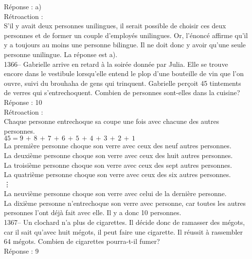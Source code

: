 ﻿\documentclass[letterpaper, 12pt]{article}
\begin{document}
R\'eponse : a)\\

R\'etroaction : \\
S'il y avait deux personnes unilingues, il serait possible de choisir ces
deux personnes et de former un couple d'employ\'es unilingues.  Or,
l'\'enonc\'e affirme qu'il y a toujours au moins une personne bilingue.  Il
ne doit donc y avoir qu'une seule personne unilingue.  La r\'eponse est
a).\\

1366-- Gabrielle arrive en retard \`a la soir\'ee donn\'ee par Julia.  Elle
se trouve encore dans le vestibule lorsqu'elle entend le plop d'une
bouteille de vin que l'on ouvre, suivi du brouhaha de gens qui trinquent.
Gabrielle per\c coit 45 tintements de verres qui s'entrechoquent.  Combien
de personnes sont-elles dans la cuisine?\\

R\'eponse : 10\\

R\'etroaction :\\
Chaque personne entrechoque sa coupe une fois avec chacune des autres
personnes.  \\
$45=9\,+\,8\,+\,7\,+\,6\,+\,5\,+\,4\,+\,3\,+\,2\,+\,1$\\
La premi\`ere personne choque son verre avec ceux des neuf autres
personnes.\\
La deuxi\`eme personne choque son verre avec ceux des huit autres
personnes.\\
La troisi\`eme personne choque son verre avec ceux des sept autres
personnes.\\
La quatri\`eme personne choque son verre avec ceux des six autres
personnes.\\
\vdots\\
La neuvi\`eme personne choque son verre avec celui de la derni\`ere
personne.\\
La dixi\`eme personne n'entrechoque son verre avec personne, car toutes les
autres personnes l'ont d\'ej\`a fait avec elle.  Il y a donc 10 personnes.\\

1367-- Un clochard n'a plus de cigarettes.  Il d\'ecide donc de ramasser des
m\'egots, car il sait qu'avec huit m\'egots, il peut faire une cigarette.
Il r\'eussit \`a rassembler 64 m\'egots.  Combien de cigarettes pourra-t-il
fumer?\\

R\'eponse : 9\\
\end{document}
